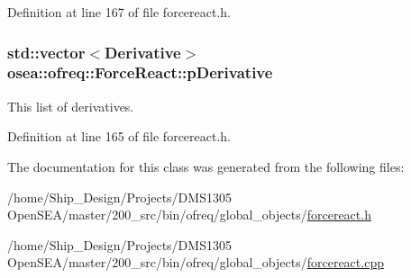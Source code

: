 Definition at line 167 of file forcereact.\-h.

\hypertarget{classosea_1_1ofreq_1_1_force_react_a28d2bfdc97809181be4d21713cc52181}{
\subsubsection[{p\-Derivative}]{\setlength{\rightskip}{0pt plus 5cm}std\-::vector$<${\bf Derivative}$>$ osea\-::ofreq\-::\-Force\-React\-::p\-Derivative\hspace{0.3cm}{\ttfamily [protected]}}}\label{classosea_1_1ofreq_1_1_force_react_a28d2bfdc97809181be4d21713cc52181}
This list of derivatives. 

Definition at line 165 of file forcereact.\-h.



The documentation for this class was generated from the following files\-:\begin{DoxyCompactItemize}
\item 
/home/\-Ship\-\_\-\-Design/\-Projects/\-D\-M\-S1305 Open\-S\-E\-A/master/200\-\_\-src/bin/ofreq/global\-\_\-objects/\hyperlink{forcereact_8h}{forcereact.\-h}\item 
/home/\-Ship\-\_\-\-Design/\-Projects/\-D\-M\-S1305 Open\-S\-E\-A/master/200\-\_\-src/bin/ofreq/global\-\_\-objects/\hyperlink{forcereact_8cpp}{forcereact.\-cpp}\end{DoxyCompactItemize}
